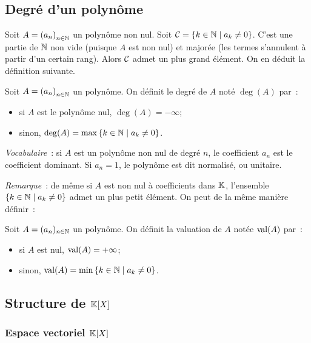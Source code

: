 \subsection{Degré d'un polynôme}

Soit \(A = {(a_n)}_{n \in \mathbb{N}}\) un polynôme non nul. Soit \(\mathcal{C} = \left\{k \in 
\mathbb{N}\mathrel{}\middle|\mathrel{}a_k \neq 0\right\}\). C'est une partie de \(\mathbb{N}\) non vide (puisque \(A\) est non 
nul) et majorée (les termes s'annulent à partir d'un certain rang). Alors 
\(\mathcal{C}\) admet un plus grand élément. On en déduit la définition suivante.

\begin{defdef}
  Soit \(A = {(a_n)}_{n \in \mathbb{N}}\) un polynôme. On définit le degré de \(A\) noté 
  \(\deg(A)\) par~:
  \begin{itemize}
    \item si \(A\) est le polynôme nul, \(\deg(A) = -\infty\);
    \item sinon, \(\deg(A) = \max \left\{k \in \mathbb{N}\mathrel{}\middle|\mathrel{}a_k \neq 0\right\}\).
  \end{itemize}
\end{defdef}

\emph{Vocabulaire}~: si \(A\) est un polynôme non nul de degré \(n\), le 
coefficient \(a_n\) est le coefficient dominant. Si \(a_n = 1\), le polynôme est 
dit normalisé, ou unitaire.

\emph{Remarque}~: de même si \(A\) est non nul à coefficients dans \(\mathbb{K}\), 
l'ensemble \(\left\{k \in \mathbb{N}\mathrel{}\middle|\mathrel{}a_k \neq 0\right\}\) admet un plus petit élément. On peut 
de la même manière définir~:

Soit \(A = (a_n)_{n \in \mathbb{N}}\) un polynôme. On définit la valuation de \(A\) notée 
\(\operatorname{val}(A)\) par~:
\begin{itemize}
  \item si \(A\) est nul, \(\operatorname{val}(A) = +\infty\);
  \item sinon, \(\operatorname{val}(A) = \min \left\{k \in \mathbb{N}\mathrel{}\middle|\mathrel{}a_k \neq 0\right\}\).
\end{itemize}


\subsection{Structure de \(\mathbb{K}[X]\)}

\subsubsection{Espace vectoriel \(\mathbb{K}[X]\)}

